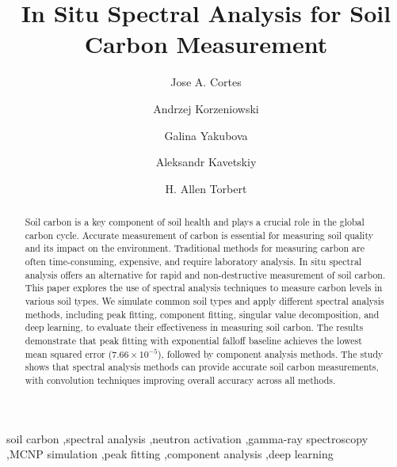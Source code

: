 \documentclass[review]{elsarticle}
\begin{document}
\begin{frontmatter}

\title{In Situ Spectral Analysis for Soil Carbon Measurement}

\author[uta]{Jose A. Cortes}

\author[uta]{Andrzej Korzeniowski}

\author[usda]{Galina Yakubova}

\author[usda]{Aleksandr Kavetskiy}

\author[usda]{H. Allen Torbert}



\begin{abstract}
Soil carbon is a key component of soil health and plays a crucial role in the global carbon cycle. Accurate measurement of carbon is essential for measuring soil quality and its impact on the environment. Traditional methods for measuring carbon are often time-consuming, expensive, and require laboratory analysis. In situ spectral analysis offers an alternative for rapid and non-destructive measurement of soil carbon. This paper explores the use of spectral analysis techniques to measure carbon levels in various soil types. We simulate common soil types and apply different spectral analysis methods, including peak fitting, component fitting, singular value decomposition, and deep learning, to evaluate their effectiveness in measuring soil carbon. The results demonstrate that peak fitting with exponential falloff baseline achieves the lowest mean squared error ($7.66\times10^{-5}$), followed by component analysis methods. The study shows that spectral analysis methods can provide accurate soil carbon measurements, with convolution techniques improving overall accuracy across all methods.
\end{abstract}

\begin{keyword}
soil carbon \sep spectral analysis \sep neutron activation \sep gamma-ray spectroscopy \sep MCNP simulation \sep peak fitting \sep component analysis \sep deep learning
\end{keyword}

\end{frontmatter}
\end{document}
